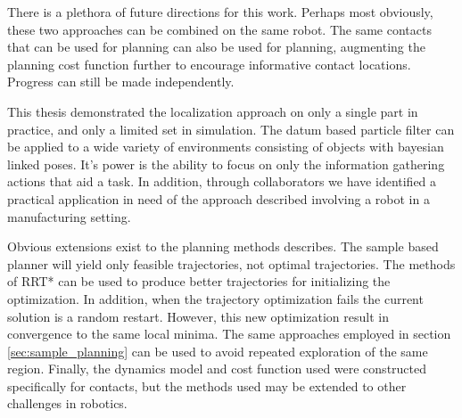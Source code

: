 \documentclass[../thesis.tex]{subfiles}
\begin{document}
There is a plethora of future directions for this work.
Perhaps most obviously, these two approaches can be combined on the same robot.
The same contacts that can be used for planning can also be used for planning, augmenting the planning cost function further to encourage informative contact locations.
Progress can still be made independently.

This thesis demonstrated the localization approach on only a single part in practice, and only a limited set in simulation.
The datum based particle filter can be applied to a wide variety of environments consisting of objects with bayesian linked poses.
It's power is the ability to focus on only the information gathering actions that aid a task.
In addition, through collaborators we have identified a practical application in need of the approach described involving a robot in a manufacturing setting.

Obvious extensions exist to the planning methods describes. The sample based planner will yield only feasible trajectories, not optimal trajectories.
The methods of RRT* can be used to produce better trajectories for initializing the optimization.
In addition, when the trajectory optimization fails the current solution is a random restart.
However, this new optimization result in convergence to the same local minima.
The same approaches employed in section \ref{sec:sample_planning} can be used to avoid repeated exploration of the same region.
Finally, the dynamics model and cost function used were constructed specifically for contacts, but the methods used may be extended to other challenges in robotics.
\end{document}
